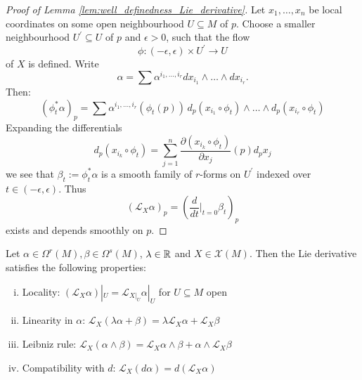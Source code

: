 \begin{proof}[Proof of Lemma \ref{lem:well_definedness_Lie_derivative}]
    Let $x_1,\ldots,x_n$ be local coordinates on some open neighbourhood $U \subseteq M$ of $p$. Choose a smaller neighbourhood $U^\prime \subseteq U$ of $p$ and $\epsilon > 0$, such that the flow
    \[
    \phi \colon (-\epsilon,\epsilon) \times U^\prime \to U
    \]
    of $X$ is defined. Write
    \[
        \alpha = \sum \alpha^{i_1,\ldots,i_r}dx_{i_1} \wedge \ldots \wedge dx_{i_r}.
    \]
    Then:
    \[
        (\phi_t^\ast\alpha)_p = \sum \alpha^{i_1,\ldots,i_r}(\phi_t(p)) \,d_p(x_{i_1} \circ \phi_t) \wedge \ldots \wedge d_p(x_{i_r} \circ \phi_t)
    \]
    Expanding the differentials 
    \[
        d_p(x_{i_k} \circ \phi_t) = \sum_{j=1}^n \frac{\partial(x_{i_k} \circ \phi_t)}{\partial x_j}(p) d_px_j
    \]
    we see that $\beta_t := \phi_t^\ast \alpha$ is a smooth family of $r$-forms on $U^\prime$ indexed over $t \in (-\epsilon,\epsilon)$. Thus
    \[
    (\mathcal{L}_X \alpha)_p = \left(\frac{d}{dt}\bigg|_{t=0} \beta_t\right)_p
    \]
    exists and depends smoothly on $p$.

\end{proof}

\begin{proposition}
    \label{prop:lie_derivative_properties}
    Let $\alpha \in \Omega^r(M), \beta \in \Omega^s(M)$, $\lambda \in \mathbb{R}$ and $X \in \mathscr{X}(M)$. Then the Lie derivative satisfies the following properties:
    \begin{enumerate}[(i)]
        \item Locality: $(\mathcal{L}_X \alpha)|_U = \mathcal{L}_{X|_U} \alpha|_U$ for $U \subseteq M$ open
        \item Linearity in $\alpha$: $\mathcal{L}_X(\lambda \alpha + \beta) = \lambda \mathcal{L}_X \alpha + \mathcal{L}_X \beta$
        \item Leibniz rule: $\mathcal{L}_X(\alpha \wedge \beta) = \mathcal{L}_X \alpha \wedge \beta + \alpha \wedge \mathcal{L}_X \beta$
        \item Compatibility with $d$: $\mathcal{L}_X(d\alpha) = d(\mathcal{L}_X\alpha)$
    \end{enumerate}
\end{proposition}

